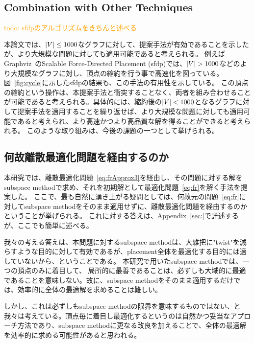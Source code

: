 \documentclass[dvipdfmx,lettersize,journal]{IEEEtran}
\newcommand{\orange}[1]{\textcolor{orange}{#1}}
\begin{document}
\subsection{Combination with Other Techniques}\label{sec:combination}

\orange{todo: sfdpのアルゴリズムをきちんと述べる}

本論文では、$\abs{V} \leq 1000$なグラフに対して、提案手法が有効であることを示したが、より大規模な問題に対しても適用可能であると考えられる。
例えばGraphviz~\cite{ellsonGraphvizOpenSourceGraph2002}のScalable Force-Directed Placement (sfdp)では、$\abs{V}>1000$などのより大規模なグラフに対し、頂点の縮約を行う事で高速化を図っている。図~\ref{fig:cycle}に示したsfdpの結果も、この手法の有用性を示している。
この頂点の縮約という操作は、本提案手法と衝突することなく、両者を組み合わせることが可能であると考えられる。具体的には、縮約後の$\abs{V}<1000$となるグラフに対して提案手法を適用することを繰り返せば、より大規模な問題に対しても適用可能であると考えられ、より高速かつより高品質な解を得ることができると考えられる。
このような取り組みは、今後の課題の一つとして挙げられる。

\subsection{何故離散最適化問題を経由するのか}\label{sec:whyDiscrete}

本研究では、離散最適化問題~\eqref{eq:frApprox3}を経由し、その問題に対する解をsubspace methodで求め、それを初期解として最適化問題~\eqref{eq:fr}を解く手法を提案した。
ここで、最も自然に湧き上がる疑問としては、何故元の問題~\eqref{eq:fr}に対してsubspace methodをそのまま適用せずに、離散最適化問題を経由するのかということが挙げられる。
これに対する答えは、Appendix~\ref{sec:}で詳述するが、ここでも簡単に述べる。

我々の考える答えは、本問題に対するsubspace methodは、大雑把に"twist"を減らすような目的に対して有効であるが、placement全体を最適化する目的には適していないから、ということである。
本研究で用いたsubspace methodでは、一つの頂点のみに着目して、
局所的に最善であることは、必ずしも大域的に最適であることを意味しない。故に、subspace methodをそのまま適用するだけでは、効率的に全体の最適解を求めることは難しい。

しかし、これは必ずしもsubspace methodの限界を意味するものではない、と我々は考えている。頂点毎に着目し最適化するというのは自然かつ妥当なアプローチ方法であり、subspace methodに更なる改良を加えることで、全体の最適解を効率的に求める可能性があると思われる。
\end{document}
